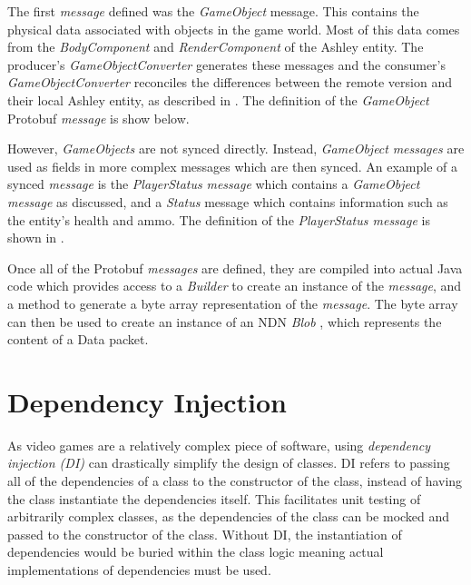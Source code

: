 The first \textit{message} defined was the \textit{GameObject} message. This contains the physical data associated with objects in the \game{} game world. Most of this data comes from the \textit{BodyComponent} and \textit{RenderComponent} of the Ashley entity. The producer's \textit{GameObjectConverter} generates these messages and the consumer's \textit{GameObjectConverter} reconciles the differences between the remote version and their local Ashley entity, as described in . The definition of the \textit{GameObject} Protobuf \textit{message} is show below.



However, \textit{GameObjects} are not synced directly. Instead, \textit{GameObject} \textit{messages} are used as fields in more complex messages which are then synced. An example of a synced \textit{message} is the \textit{PlayerStatus} \textit{message} which contains a \textit{GameObject message} as discussed, and a \textit{Status} message which contains information such as the entity's health and ammo. The definition of the \textit{PlayerStatus message} is shown in .




Once all of the Protobuf \textit{messages} are defined, they are compiled into actual Java code which provides access to a \textit{Builder} to create an instance of the \textit{message}, and a method to generate a byte array representation of the \textit{message}. The byte array can then be used to create an instance of an NDN \textit{Blob} \cite{ndn-ccl-blob}, which represents the content of a Data packet. 

\section{Dependency Injection}
As video games are a relatively complex piece of software, using \textit{dependency injection (DI)} can drastically simplify the design of classes. DI refers to passing all of the dependencies of a class to the constructor of the class, instead of having the class instantiate the dependencies itself. This facilitates unit testing of arbitrarily complex classes, as the dependencies of the class can be mocked and passed to the constructor of the class. Without DI, the instantiation of dependencies would be buried within the class logic meaning actual implementations of dependencies must be used.

